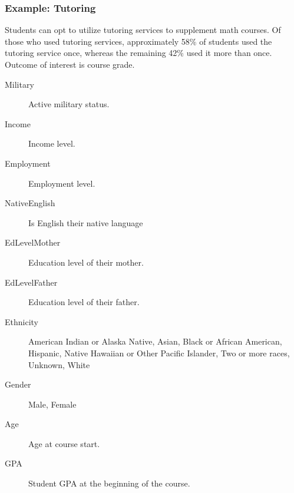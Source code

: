 \documentclass[10pt,slidestop,mathserif,c]{beamer}
\begin{document}
\begin{frame}
    \frametitle{Example: Tutoring}
    Students can opt to utilize tutoring services to supplement math courses. Of those who used tutoring services, approximately 58\% of students used the tutoring service once, whereas the remaining 42\% used it more than once. Outcome of interest is course grade.
    \begin{description}
        \item[Military] Active military status.
        \item[Income] Income level.
        \item[Employment] Employment level.
        \item[NativeEnglish] Is English their native language
        \item[EdLevelMother] Education level of their mother.
        \item[EdLevelFather] Education level of their father.
        \item[Ethnicity] American Indian or Alaska Native, Asian, Black or African American, Hispanic, Native Hawaiian or Other Pacific Islander, Two or more races, Unknown, White
        \item[Gender] Male, Female
        \item[Age] Age at course start.
        \item[GPA] Student GPA at the beginning of the course.
    \end{description}

\end{frame}

%
\end{document}

